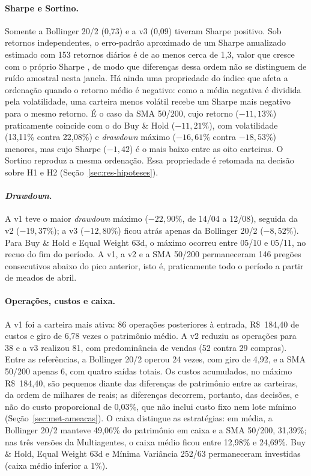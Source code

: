 \paragraph*{Sharpe e Sortino.} Somente a Bollinger 20/2 (0,73) e a v3 (0,09) tiveram Sharpe positivo. Sob retornos independentes, o erro-padrão aproximado de um Sharpe anualizado estimado com 153 retornos diários é de ao menos cerca de 1,3, valor que cresce com o próprio Sharpe \citep{Lo2002}, de modo que diferenças dessa ordem não se distinguem de ruído amostral nesta janela. Há ainda uma propriedade do índice que afeta a ordenação quando o retorno médio é negativo: como a média negativa é dividida pela volatilidade, uma carteira menos volátil recebe um Sharpe mais negativo para o mesmo retorno. É o caso da SMA 50/200, cujo retorno ($-11{,}13\%$) praticamente coincide com o do Buy \& Hold ($-11{,}21\%$), com volatilidade (13,11\% contra 22,08\%) e \textit{drawdown} máximo ($-16{,}61\%$ contra $-18{,}53\%$) menores, mas cujo Sharpe ($-1{,}42$) é o mais baixo entre as oito carteiras. O Sortino reproduz a mesma ordenação. Essa propriedade é retomada na decisão sobre H1 e H2 (Seção~\ref{sec:res-hipoteses}).

\paragraph*{\textit{Drawdown}.} A v1 teve o maior \textit{drawdown} máximo ($-22{,}90\%$, de 14/04 a 12/08), seguida da v2 ($-19{,}37\%$); a v3 ($-12{,}80\%$) ficou atrás apenas da Bollinger 20/2 ($-8{,}52\%$). Para Buy \& Hold e Equal Weight 63d, o máximo ocorreu entre 05/10 e 05/11, no recuo do fim do período. A v1, a v2 e a SMA 50/200 permaneceram 146 pregões consecutivos abaixo do pico anterior, isto é, praticamente todo o período a partir de meados de abril.

\paragraph*{Operações, custos e caixa.} A v1 foi a carteira mais ativa: 86 operações posteriores à entrada, R\$~184,40 de custos e giro de 6,78 vezes o patrimônio médio. A v2 reduziu as operações para 38 e a v3 realizou 81, com predominância de vendas (52 contra 29 compras). Entre as referências, a Bollinger 20/2 operou 24 vezes, com giro de 4,92, e a SMA 50/200 apenas 6, com quatro saídas totais. Os custos acumulados, no máximo R\$~184,40, são pequenos diante das diferenças de patrimônio entre as carteiras, da ordem de milhares de reais; as diferenças decorrem, portanto, das decisões, e não do custo proporcional de 0,03\%, que não inclui custo fixo nem lote mínimo (Seção~\ref{sec:met-ameacas}). O caixa distingue as estratégias: em média, a Bollinger 20/2 manteve 49,06\% do patrimônio em caixa e a SMA 50/200, 31,39\%; nas três versões da Multiagentes, o caixa médio ficou entre 12,98\% e 24,69\%. Buy \& Hold, Equal Weight 63d e Mínima Variância 252/63 permaneceram investidas (caixa médio inferior a 1\%).

